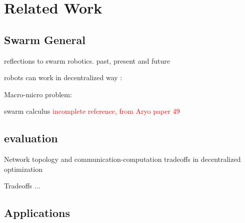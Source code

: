 \chapter{Related Work}
\label{ch2}


\section{Swarm General}

\cite{dorigo2014swarm}
\cite{dorigo2020reflections} reflections to swarm robotics.
\cite{dorigo2021swarm} past, present and future

robots can work in decentralized way :
\cite{dorigo2004evolving}
\cite{nouyan2009teamwork}
\cite{dorigo2013swarmanoid}
\cite{rubenstein2014programmable}
\cite{li2019decentralized}


Macro-micro problem:

\cite{hamann2008framework}
\cite{hamann2010space}
\cite{hamann2018swarm}
\cite{hamann2013towards} swarm calculus
\cite{valentini2015efficient} \textcolor{red}{incomplete reference, from Aryo paper 49}

\section{evaluation}

\cite{eberhardinger2018approach}
\cite{eberhardinger2018measuring}
\cite{kaddoum2010criteria}

\cite{nedic2018network} Network topology and communication-computation tradeoffs in decentralized optimization

\cite{jovanovic2016controller} Tradeoffs ...


\section{Applications}

